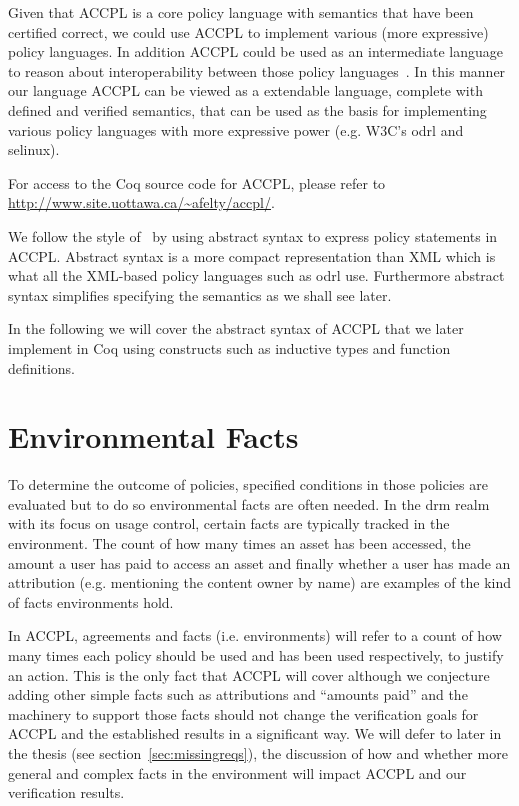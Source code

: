\documentclass[runningheads,a4paper]{llncs}
\begin{document}
Given that \ac{ACCPL} is a core policy language with semantics that have been certified correct, we could use \ac{ACCPL} to implement various (more expressive) policy languages. In addition \ac{ACCPL} could be used as an intermediate language to reason about interoperability between those policy languages~\cite{prados2005interoperability,maronas2009architecture}. In this manner our language \ac{ACCPL} can be viewed as a extendable language, complete with defined and verified semantics, that can be used as the basis for implementing various policy languages with more expressive power (e.g. W3C's \ac{odrl} and \ac{selinux}). 

For access to the Coq source code for \ac{ACCPL}, please refer to \url{http://www.site.uottawa.ca/~afelty/accpl/}.


We follow the style of~\cite{pucella2006} by using abstract syntax to express policy statements in \ac{ACCPL}. Abstract syntax is a more compact representation than XML which is what all the XML-based policy languages such as \ac{odrl} use. Furthermore abstract syntax simplifies specifying the semantics as we shall see later. 

In the following we will cover the abstract syntax of \ac{ACCPL} that we later implement in Coq using constructs such as inductive types and function definitions. 


\section{Environmental Facts}\label{sec:odrl0}
To determine the outcome of policies, specified conditions in those policies are evaluated but to do so environmental facts are often needed. In the \ac{drm} realm with its focus on usage control, certain facts are typically tracked in the environment. The count of how many times an asset has been accessed, the amount a user has paid to access an asset and finally whether a user has made an attribution (e.g. mentioning the content owner by name) are examples of the kind of facts environments hold.

In \ac{ACCPL}, agreements and facts (i.e. environments) will refer to a count of how many times each policy should be used and has been used respectively, to justify an action. This is the only fact that \ac{ACCPL} will cover although we conjecture adding other simple facts such as attributions and ``amounts paid'' and the machinery to support those facts should not change the verification goals for \ac{ACCPL} and the established results in a significant way. We will defer to later in the thesis (see section~\ref{sec:missingreqs}), the discussion of how and whether more general and complex facts in the environment will impact \ac{ACCPL} and our verification results.   
\end{document}

